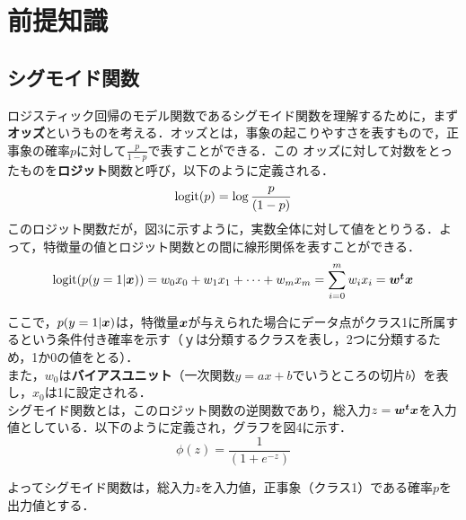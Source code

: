 \documentclass[a4j, 11pt]{jsarticle}
\numberwithin{equation}{section}
\newcommand{\mathbm}[1]{{\mbox{\boldmath $#1$}}}
\begin{document}
\section{前提知識}
\subsection{シグモイド関数}
\indent ロジスティック回帰のモデル関数であるシグモイド関数を理解するために，まず\textbf{オッズ}というものを考える．オッズとは，事象の起こりやすさを表すもので，正事象の確率$p$に対して$\frac{p}{1-p}$で表すことができる．この
オッズに対して対数をとったものを\textbf{ロジット}関数と呼び，以下のように定義される．
\begin{equation}
		{\rm logit}(p) = \log{\frac{p}{(1-p)}}
 \end{equation}
\indent このロジット関数だが，図3に示すように，実数全体に対して値をとりうる．よって，特徴量の値とロジット関数との間に線形関係を表すことができる．
\begin{equation}
		{\rm logit}(p(y=1|\mathbm{x})) = w_0x_0+w_1x_1+\cdots+w_mx_m = \sum_{i=0}^{m}w_ix_i = \mathbm{w^tx}
 	\end{equation}
 	
\indent ここで，$p(y=1|\mathbm{x})$は，特徴量$\mathbm{x}$が与えられた場合にデータ点がクラス1に所属するという条件付き確率を示す（$ｙ$は分類するクラスを表し，2つに分類するため，1か0の値をとる）．\\
\indent また，$w_0$は\textbf{バイアスユニット}（一次関数$y=ax+b$でいうところの切片$b$）を表し，$x_0$は1に設定される．\\

\indent シグモイド関数とは，このロジット関数の逆関数であり，総入力$z = \mathbm{w^tx}$を入力値としている．以下のように定義され，グラフを図4に示す．
\begin{equation}
		\phi (z) = \frac{1}{(1+e^{-z})}
		\label{sigmo}
 	\end{equation}
 	
\indent よってシグモイド関数は，総入力$z$を入力値，正事象（クラス1）である確率$p$を出力値とする．\\
\end{document}
